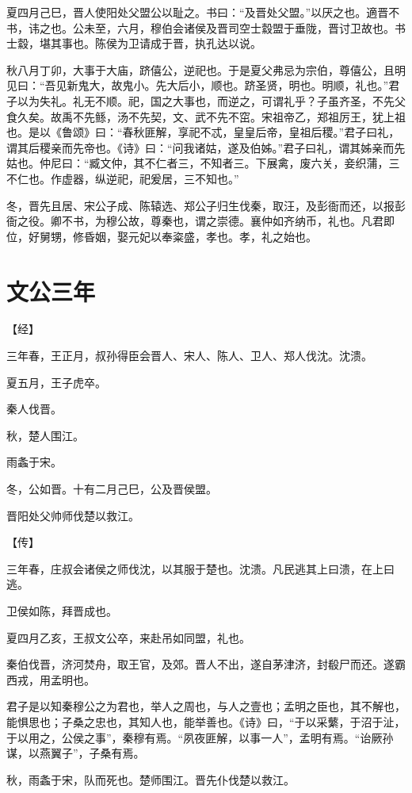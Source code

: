 \documentclass[a4paper,12pt,UTF8,twoside]{ctexbook}
\begin{document}
夏四月己巳，晋人使阳处父盟公以耻之。书曰：“及晋处父盟。”以厌之也。適晋不书，讳之也。公未至，六月，穆伯会诸侯及晋司空士縠盟于垂陇，晋讨卫故也。书士縠，堪其事也。陈侯为卫请成于晋，执孔达以说。

秋八月丁卯，大事于大庙，跻僖公，逆祀也。于是夏父弗忌为宗伯，尊僖公，且明见曰：“吾见新鬼大，故鬼小。先大后小，顺也。跻圣贤，明也。明顺，礼也。”君子以为失礼。礼无不顺。祀，国之大事也，而逆之，可谓礼乎？子虽齐圣，不先父食久矣。故禹不先鲧，汤不先契，文、武不先不窋。宋祖帝乙，郑祖厉王，犹上祖也。是以《鲁颂》曰：“春秋匪解，享祀不忒，皇皇后帝，皇祖后稷。”君子曰礼，谓其后稷亲而先帝也。《诗》曰：“问我诸姑，遂及伯姊。”君子曰礼，谓其姊亲而先姑也。仲尼曰：“臧文仲，其不仁者三，不知者三。下展禽，废六关，妾织蒲，三不仁也。作虚器，纵逆祀，祀爰居，三不知也。”

冬，晋先且居、宋公子成、陈辕选、郑公子归生伐秦，取汪，及彭衙而还，以报彭衙之役。卿不书，为穆公故，尊秦也，谓之崇德。襄仲如齐纳币，礼也。凡君即位，好舅甥，修昏姻，娶元妃以奉粢盛，孝也。孝，礼之始也。

\chapter{文公三年}




【经】

三年春，王正月，叔孙得臣会晋人、宋人、陈人、卫人、郑人伐沈。沈溃。

夏五月，王子虎卒。

秦人伐晋。

秋，楚人围江。

雨螽于宋。

冬，公如晋。十有二月己巳，公及晋侯盟。

晋阳处父帅师伐楚以救江。

【传】

三年春，庄叔会诸侯之师伐沈，以其服于楚也。沈溃。凡民逃其上曰溃，在上曰逃。

卫侯如陈，拜晋成也。

夏四月乙亥，王叔文公卒，来赴吊如同盟，礼也。

秦伯伐晋，济河焚舟，取王官，及郊。晋人不出，遂自茅津济，封殽尸而还。遂霸西戎，用孟明也。

君子是以知秦穆公之为君也，举人之周也，与人之壹也；孟明之臣也，其不解也，能惧思也；子桑之忠也，其知人也，能举善也。《诗》曰，“于以采蘩，于沼于沚，于以用之，公侯之事”，秦穆有焉。“夙夜匪解，以事一人”，孟明有焉。“诒厥孙谋，以燕翼子”，子桑有焉。

秋，雨螽于宋，队而死也。楚师围江。晋先仆伐楚以救江。
\end{document}
